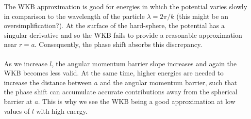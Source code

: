 \documentclass[10pt,letterpaper]{article}
\begin{document}
	\item
	The WKB approximation is good for energies in which the potential varies slowly in comparison to the 
	wavelength of the particle $\lambda = 2\pi/k$ (this might be an oversimplification?). At the surface of the
	hard-sphere, the potential has a singular derivative and so the WKB fails to provide a reasonable 
	approximation near $r=a$. Consequently, the phase shift absorbs this discrepancy. 
	\\
	\\
	As we increase $l$, the angular momentum barrier slope increases and again the WKB becomes less valid. At the 
	same time, 
	higher energies are needed to increase the distance between $a$ and the angular momentum barrier, such
	that the phase shift can accumulate accurate contributions away from the spherical barrier at $a$. This is why we see 	the WKB being a good approximation at low values of $l$ with high energy. 
	\eenum
\eenum
\end{document}

